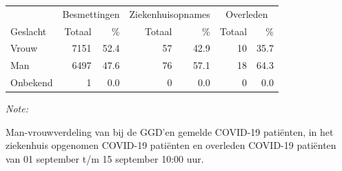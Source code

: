 \documentclass[
  english,
  man,floatsintext]{apa6}
\begin{document}
\begin{table}[H]
\centering\begingroup\fontsize{11}{13}\selectfont

\begin{threeparttable}
\begin{tabular}{lrrrrrr}
\toprule
\multicolumn{1}{c}{ } & \multicolumn{2}{c}{Besmettingen} & \multicolumn{2}{c}{Ziekenhuisopnames} & \multicolumn{2}{c}{Overleden} \\
\cmidrule(l{3pt}r{3pt}){2-3} \cmidrule(l{3pt}r{3pt}){4-5} \cmidrule(l{3pt}r{3pt}){6-7}
Geslacht & Totaal & \% & Totaal & \% & Totaal & \%\\
\midrule
Vrouw & 7151 & 52.4 & 57 & 42.9 & 10 & 35.7\\
Man & 6497 & 47.6 & 76 & 57.1 & 18 & 64.3\\
Onbekend & 1 & 0.0 & 0 & 0.0 & 0 & 0.0\\
\bottomrule
\end{tabular}
\begin{tablenotes}
\item \textit{Note: } 
\item Man-vrouwverdeling van bij de GGD’en gemelde COVID-19 patiënten, in het ziekenhuis opgenomen COVID-19 patiënten en overleden COVID-19 patiënten van 01 september t/m 15 september 10:00 uur.
\end{tablenotes}
\end{threeparttable}
\endgroup{}
\end{table}
\newpage
\end{document}
